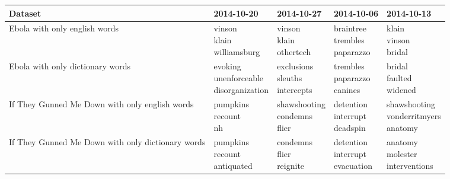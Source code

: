 \documentclass[11pt, oneside]{article}
\makeatletter
\newcommand{\specialcell}[2][c]{%
  \begin{tabular}[#1]{@{}c@{}}#2\end{tabular}}
\makeatother
\begin{document}
\begin{enumerate}
\begin{tabularx}{\textwidth}{X|l|l|l|l}
\textbf{Dataset} & \textbf{2014-10-20} & \textbf{2014-10-27} & \textbf{2014-10-06} & \textbf{2014-10-13} \\
\hline Ebola with only english words & 
\specialcell{vinson\\klain\\williamsburg} & 
\specialcell{vinson\\klain\\othertech} & 
\specialcell{braintree\\trembles\\paparazzo} & 
\specialcell{klain\\vinson\\bridal} \\ 
\hline Ebola with only dictionary words & 
\specialcell{evoking\\unenforceable\\disorganization} & 
\specialcell{exclusions\\sleuths\\intercepts} & 
\specialcell{trembles\\paparazzo\\canines} &
 \specialcell{bridal\\faulted\\widened}  \\ 
\hline If They Gunned Me Down with only english words & 
\specialcell{pumpkins\\recount\\nh} & 
\specialcell{shawshooting\\condemns\\flier} & 
\specialcell{detention\\interrupt\\deadspin} & 
\specialcell{shawshooting\\vonderritmyers\\anatomy} \\ 
\hline If They Gunned Me Down with only dictionary words & 
\specialcell{pumpkins\\recount\\antiquated} & 
\specialcell{condemns\\flier\\reignite} & 
\specialcell{detention\\interrupt\\evacuation} & 
\specialcell{anatomy\\molester\\interventions} \\ 

\end{tabularx}
\end{enumerate}
\end{document}
